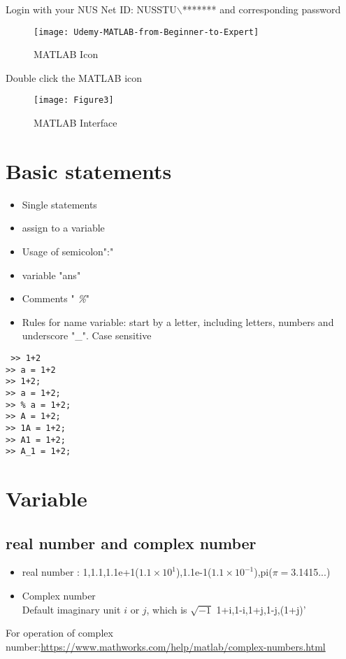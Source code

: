 \documentclass{article}
\begin{document}
 
    	 Login with your NUS Net ID:{\color{blue} NUSSTU$\backslash$******* } and corresponding password
    
  \begin{figure}[H]
  	\centering
  	\texttt{[image: Udemy-MATLAB-from-Beginner-to-Expert]}
  	\caption{MATLAB Icon}
  	\label{fig:udemy-matlab-from-beginner-to-expert}
  \end{figure}
  	 Double click the MATLAB icon 



\begin{figure}[H]
	\centering
	\texttt{[image: Figure3]}
	\caption{MATLAB Interface}
	\label{fig:figure3}
\end{figure}





\section{Basic statements}

  \begin{itemize}
    \item Single statements
    \item assign to a variable
    \item Usage of semicolon"{\color{blue}:}"
    \item variable "{\color{blue}ans}"
    \item Comments "{\color{blue} \emph\%}"
    \item Rules for name variable: start by a letter, including letters, numbers and underscore "\_". Case sensitive
  \end{itemize}
  \begin{lstlisting}
 >> 1+2
>> a = 1+2
>> 1+2;
>> a = 1+2;
>> % a = 1+2;
>> A = 1+2;
>> 1A = 1+2;
>> A1 = 1+2;
>> A_1 = 1+2;
  \end{lstlisting}

\section{Variable}
\subsection{real number and complex number}
\begin{itemize}
  \item real number :
          1,1.1,1.1e+1($1.1\times 10^{1}$),1.1e-1($1.1\times 10^{-1}$),pi($\pi=$3.1415...)\\
  \item Complex number\\
        Default imaginary unit $i$ or $j$, which is $\sqrt{-1}$
          1+i,1-i,1+j,1-j,(1+j)'
\end{itemize}
 For operation of complex number:{\tiny \url{https://www.mathworks.com/help/matlab/complex-numbers.html}}
\end{document}
